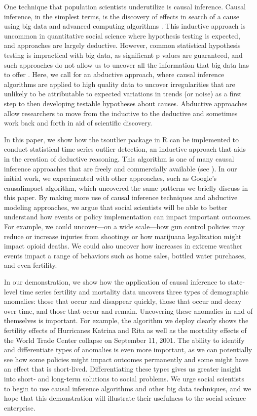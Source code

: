 \documentclass[12pt]{article}
\begin{document}
One technique that population scientists underutilize is causal
inference. Causal inference, in the simplest terms, is the discovery of
effects in search of a cause using big data and advanced computing
algorithms \citep{imai2008misunderstandings}. This inductive approach is
uncommon in quantitative social science where hypothesis testing is
expected, and approaches are largely deductive. However, common
statistical hypothesis testing is impractical with big data, as
significant p values are guaranteed, and such approaches do not allow us
to uncover all the information that big data has to offer
\citep{monroe2015no}. Here, we call for an abductive approach, where
causal inference algorithms are applied to high quality data to uncover
irregularities that are unlikely to be attributable to expected
variations in trends (or noise) as a first step to then developing
testable hypotheses about causes. Abductive approaches allow researchers
to move from the inductive to the deductive and sometimes work back and
forth in aid of scientific discovery.

In this paper, we show how the tsoutlier package in R can be implemented
to conduct statistical time series outlier detection, an inductive
approach that aids in the creation of deductive reasoning. This
algorithm is one of many causal inference approaches that are freely and
commercially available (see \citet{rcausalimpact}). In our initial work,
we experimented with other approaches, such as Google's causalimpact
algorithm, which uncovered the same patterns we briefly discuss in this
paper. By making more use of causal inference techniques and abductive
modeling approaches, we argue that social scientists will be able to
better understand how events or policy implementation can impact
important outcomes. For example, we could uncover---on a wide
scale---how gun control policies may reduce or increase injuries from
shootings or how marijuana legalization might impact opioid deaths. We
could also uncover how increases in extreme weather events impact a
range of behaviors such as home sales, bottled water purchases, and even
fertility.

In our demonstration, we show how the application of causal inference to
state-level time series fertility and mortality data uncovers three
types of demographic anomalies: those that occur and disappear quickly,
those that occur and decay over time, and those that occur and remain.
Uncovering these anomalies in and of themselves is important. For
example, the algorithm we deploy clearly shows the fertility effects of
Hurricanes Katrina and Rita as well as the mortality effects of the
World Trade Center collapse on September 11, 2001. The ability to
identify and differentiate types of anomalies is even more important, as
we can potentially see how some policies might impact outcomes
permanently and some might have an effect that is short-lived.
Differentiating these types gives us greater insight into short- and
long-term solutions to social problems. We urge social scientists to
begin to use causal inference algorithms and other big data techniques,
and we hope that this demonstration will illustrate their usefulness to
the social science enterprise.

\newpage



\end{document}
